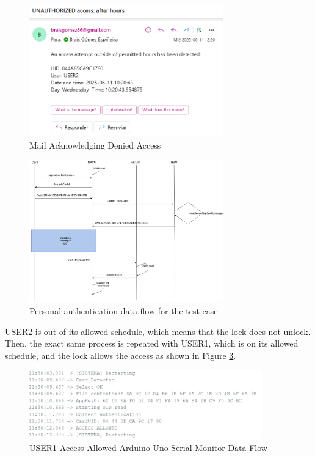 \begin{figure}[H]
	\centering
	\includegraphics[width=0.75\textwidth]{imaxes/Correo_denegado}
	\caption{Mail Acknowledging Denied Access}
	\label{fig:denied-mail}
\end{figure}
\begin{figure}[H]
	\centering
	\includegraphics[width=0.75\textwidth]{imaxes/TIDF}
	\caption{Personal authentication data flow for the test case}
	\label{fig:Personal Auth Data Flow}
\end{figure}

USER2 is out of its allowed schedule, which means that the lock does not unlock. Then, the exact same process is repeated with USER1, which is on its allowed schedule, and the lock allows the access as shown in Figure \ref{fig:uid-ok}.

\begin{figure}[H]
	\centering
	\includegraphics[width=0.9\textwidth]{imaxes/User_Allowed}
	\caption{USER1 Access Allowed Arduino Uno Serial Monitor Data Flow}
	\label{fig:uid-ok}
\end{figure}

